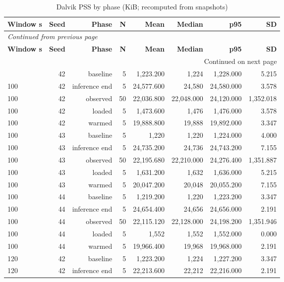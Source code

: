 \documentclass[10pt,a4paper]{article}
\begin{document}
\begin{longtable}{@{}lrrrrrrr@{}}
\caption{Dalvik PSS by phase (KiB; recomputed from snapshots)}\\
\toprule
\textbf{Window s} & \textbf{Seed} & \textbf{Phase} & \textbf{N} & \textbf{Mean} & \textbf{Median} & \textbf{p95} & \textbf{SD} \\
\midrule\endfirsthead
\multicolumn{8}{l}{\small\itshape Continued from previous page}\\
\toprule
\textbf{Window s} & \textbf{Seed} & \textbf{Phase} & \textbf{N} & \textbf{Mean} & \textbf{Median} & \textbf{p95} & \textbf{SD} \\
\midrule\endhead
\midrule\multicolumn{8}{r}{\small Continued on next page}\\\endfoot
\bottomrule\endlastfoot
100 & 42 & baseline & 5 & 1,223.200 & 1,224 & 1,228.000 & 5.215 \\
100 & 42 & inference end & 5 & 24,577.600 & 24,580 & 24,580.000 & 3.578 \\
100 & 42 & observed & 50 & 22,036.800 & 22,048.000 & 24,120.000 & 1,352.018 \\
100 & 42 & loaded & 5 & 1,473.600 & 1,476 & 1,476.000 & 3.578 \\
100 & 42 & warmed & 5 & 19,888.800 & 19,888 & 19,892.000 & 3.347 \\
100 & 43 & baseline & 5 & 1,220 & 1,220 & 1,224.000 & 4.000 \\
100 & 43 & inference end & 5 & 24,735.200 & 24,736 & 24,743.200 & 7.155 \\
100 & 43 & observed & 50 & 22,195.680 & 22,210.000 & 24,276.400 & 1,351.887 \\
100 & 43 & loaded & 5 & 1,631.200 & 1,632 & 1,636.000 & 5.215 \\
100 & 43 & warmed & 5 & 20,047.200 & 20,048 & 20,055.200 & 7.155 \\
100 & 44 & baseline & 5 & 1,219.200 & 1,220 & 1,223.200 & 3.347 \\
100 & 44 & inference end & 5 & 24,654.400 & 24,656 & 24,656.000 & 2.191 \\
100 & 44 & observed & 50 & 22,115.120 & 22,128.000 & 24,198.200 & 1,351.946 \\
100 & 44 & loaded & 5 & 1,552 & 1,552 & 1,552.000 & 0.000 \\
100 & 44 & warmed & 5 & 19,966.400 & 19,968 & 19,968.000 & 2.191 \\
120 & 42 & baseline & 5 & 1,223.200 & 1,224 & 1,227.200 & 3.347 \\
120 & 42 & inference end & 5 & 22,213.600 & 22,212 & 22,216.000 & 2.191 \\

\end{longtable}
\end{document}
